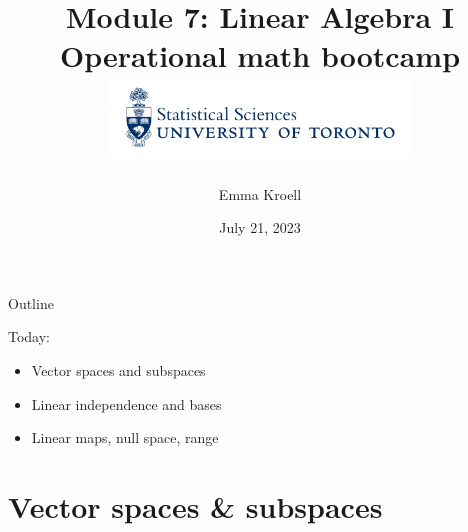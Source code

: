 \documentclass [aspectratio=169]{beamer}
\title[]{Module 7: Linear Algebra I \\ {\large Operational math bootcamp}\\ \includegraphics[width=8cm]{dept_logo.png}\vspace{-1em}}
\author[]{Emma Kroell}
\institute[]{University of Toronto}
\date{July 21, 2023}
\begin{document}
{
\begin{frame}
    \titlepage
\end{frame}
}

\begin{frame}{Outline}


Today:
    \begin{itemize}
      \setlength\itemsep{0.5em}
         \item Vector spaces and subspaces
    	\item Linear independence and bases
	\item Linear maps, null space, range
    \end{itemize}
\end{frame}

\section{Vector spaces \& subspaces}
\end{document}
